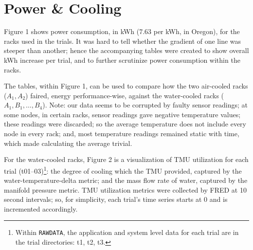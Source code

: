 \documentclass[10pt]{report}
\begin{document}
 \section{Power \& Cooling}

 Figure 1 shows power consumption, in kWh (7.63\textcent{} per kWh, in Oregon), for the racks used in the trials. It was hard to tell whether the gradient of one line was steeper than another; hence the accompanying tables were created to show overall kWh increase per trial, and to further scrutinize power consumption within the racks. 

The tables, within Figure 1, can be used to compare how the two air-cooled racks ($A_1,A_2$) faired, energy performance-wise, against the water-cooled racks ($A_1,B_1,\dots,B_4$). Note: our data seems to be corrupted by faulty sensor readings; at some nodes, in certain racks, sensor readings gave negative temperature values; these readings were discarded; so the average temperature does not include every node in every rack; and, most temperature readings remained static with time, which made calculating the average trivial.

For the water-cooled racks, Figure 2 is a visualization of TMU utilization for each trial (t01--03)\footnote{Within {\tt RAWDATA}, the application and system level data for each trial are in the trial directories: t1, t2, t3.}: the degree of cooling which the TMU provided, captured by the water-temperature-delta metric; and the mass flow rate of water, captured by the manifold pressure metric. 
TMU utilization metrics were collected by FRED at 10 second intervals; so, for simplicity, each trial's time series starts at 0 and is incremented accordingly.


\end{document}
